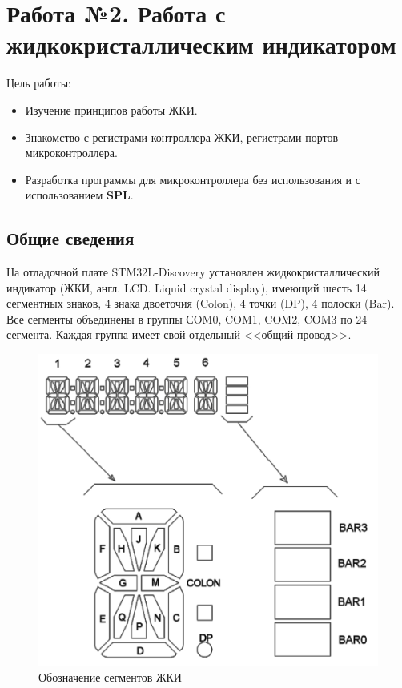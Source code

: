 \chapter{Работа №2. Работа с жидкокристаллическим индикатором}
Цель работы: 
\begin{itemize}
\item Изучение принципов работы ЖКИ.
\item Знакомство с регистрами контроллера ЖКИ, регистрами портов микроконтроллера.
\item Разработка программы для микроконтроллера без использования и с использованием \textbf{SPL}.
\end{itemize}

\section{Общие сведения}

На отладочной плате STM32L-Discovery установлен жидкокристаллический индикатор (ЖКИ, англ. LCD. Liquid crystal display), имеющий шесть 14 сегментных знаков, 4 знака двоеточия (Colon), 4 точки (DP), 4 полоски (Bar). Все сегменты объединены в группы СOM0, COM1, COM2, COM3 по 24 сегмента. Каждая группа имеет свой отдельный <<общий провод>>.

\begin{figure}[h!]
\begin{center}
\includegraphics[scale=0.4]{Image/23.jpg}
\end{center}

\caption{Обозначение сегментов ЖКИ}
\end{figure}

